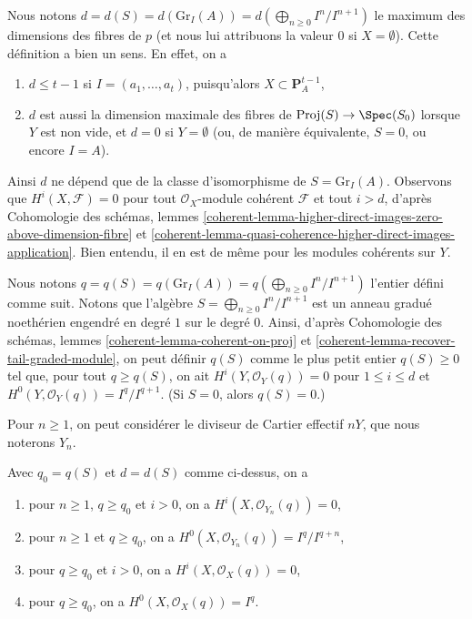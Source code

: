 \medskip\noindent
Nous notons $d = d(S) = d(\text{Gr}_I(A)) = d(\bigoplus_{n \geq 0} I^n/I^{n + 1})$ le maximum des dimensions des fibres de $p$ (et nous lui attribuons la valeur $0$ si $X = \emptyset$). Cette définition a bien un sens. En effet, on a
\begin{enumerate}
\item $d \leq t - 1$ si $I = (a_1, \ldots, a_t)$, puisqu'alors $X \subset \mathbf{P}^{t - 1}_A$,
\item $d$ est aussi la dimension maximale des fibres de $\text{Proj}(S) \to \Spec(S_0)$ lorsque $Y$ est non vide, et $d = 0$ si $Y = \emptyset$ (ou, de manière équivalente, $S = 0$, ou encore $I = A$).
\end{enumerate}
Ainsi $d$ ne dépend que de la classe d'isomorphisme de $S = \text{Gr}_I(A)$. Observons que $H^i(X, \mathcal{F}) = 0$ pour tout $\mathcal{O}_X$-module cohérent $\mathcal{F}$ et tout $i > d$, d'après Cohomologie des schémas, lemmes \ref{coherent-lemma-higher-direct-images-zero-above-dimension-fibre} et \ref{coherent-lemma-quasi-coherence-higher-direct-images-application}. Bien entendu, il en est de même pour les modules cohérents sur $Y$.

\medskip\noindent
Nous notons $q = q(S) = q(\text{Gr}_I(A)) = q(\bigoplus_{n \geq 0} I^n/I^{n + 1})$ l'entier défini comme suit. Notons que l'algèbre $S = \bigoplus_{n \geq 0} I^n/I^{n + 1}$ est un anneau gradué noethérien engendré en degré $1$ sur le degré $0$. Ainsi, d'après Cohomologie des schémas, lemmes \ref{coherent-lemma-coherent-on-proj} et \ref{coherent-lemma-recover-tail-graded-module}, on peut définir $q(S)$ comme le plus petit entier $q(S) \geq 0$ tel que, pour tout $q \geq q(S)$, on ait $H^i(Y, \mathcal{O}_Y(q)) = 0$ pour $1 \leq i \leq d$ et $H^0(Y, \mathcal{O}_Y(q)) = I^q/I^{q + 1}$. (Si $S = 0$, alors $q(S) = 0$.)

\medskip\noindent
Pour $n \geq 1$, on peut considérer le diviseur de Cartier effectif $nY$, que nous noterons $Y_n$.

\begin{lemma}
\label{lemma-bound-q-and-d}
Avec $q_0 = q(S)$ et $d = d(S)$ comme ci-dessus, on a
\begin{enumerate}
\item pour $n \geq 1$, $q \geq q_0$ et $i > 0$, on a $H^i(X, \mathcal{O}_{Y_n}(q)) = 0$,
\item pour $n \geq 1$ et $q \geq q_0$, on a $H^0(X, \mathcal{O}_{Y_n}(q)) = I^q/I^{q + n}$,
\item pour $q \geq q_0$ et $i > 0$, on a $H^i(X, \mathcal{O}_X(q)) = 0$,
\item pour $q \geq q_0$, on a $H^0(X, \mathcal{O}_X(q)) = I^q$.
\end{enumerate}
\end{lemma}

